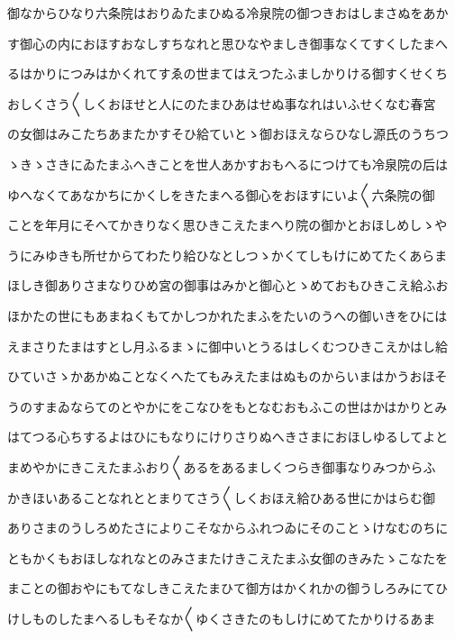 \documentclass[a4paper,11pt,landscape]{ltjtarticle}
\begin{document}
\par\medskip
御なからひなり六条院はおりゐたまひぬる冷泉院の御つきおはしまさぬをあか
\par\medskip
す御心の内におほすおなしすちなれと思ひなやましき御事なくてすくしたまへ
\par\medskip
るはかりにつみはかくれてすゑの世まてはえつたふましかりける御すくせくち
\par\medskip
おしくさう〱しくおほせと人にのたまひあはせぬ事なれはいふせくなむ春宮
\par\medskip
の女御はみこたちあまたかすそひ給ていとゝ御おほえならひなし源氏のうちつ
\par\medskip
ゝきゝさきにゐたまふへきことを世人あかすおもへるにつけても冷泉院の后は
\par\medskip
ゆへなくてあなかちにかくしをきたまへる御心をおほすにいよ〱六条院の御
\par\medskip
ことを年月にそへてかきりなく思ひきこえたまへり院の御かとおほしめしゝや
\par\medskip
うにみゆきも所せからてわたり給ひなとしつゝかくてしもけにめてたくあらま
\par\medskip
ほしき御ありさまなりひめ宮の御事はみかと御心とゝめておもひきこえ給ふお
\par\medskip
ほかたの世にもあまねくもてかしつかれたまふをたいのうへの御いきをひには
\par\medskip
えまさりたまはすとし月ふるまゝに御中いとうるはしくむつひきこえかはし給
\par\medskip
ひていさゝかあかぬことなくへたてもみえたまはぬものからいまはかうおほそ
\par\medskip
うのすまゐならてのとやかにをこなひをもとなむおもふこの世はかはかりとみ
\par\medskip
はてつる心ちするよはひにもなりにけりさりぬへきさまにおほしゆるしてよと
\par\medskip
まめやかにきこえたまふおり〱あるをあるましくつらき御事なりみつからふ
\par\medskip
かきほいあることなれととまりてさう〱しくおほえ給ひある世にかはらむ御
\par\medskip
ありさまのうしろめたさによりこそなからふれつゐにそのことゝけなむのちに
\par\medskip
ともかくもおほしなれなとのみさまたけきこえたまふ女御のきみたゝこなたを
\par\medskip
まことの御おやにもてなしきこえたまひて御方はかくれかの御うしろみにてひ
\par\medskip
けしものしたまへるしもそなか〱ゆくさきたのもしけにめてたかりけるあま
\par\medskip
\end{document}
